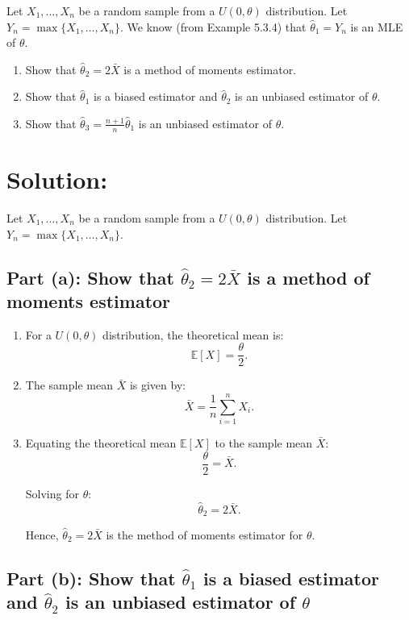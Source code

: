 \documentclass{article}
\begin{document}
Let $X_1, \dots, X_n$ be a random sample from a $U(0, \theta)$ distribution. Let $Y_n = \max\{X_1, \dots, X_n\}$. We know (from Example 5.3.4) that $\hat{\theta}_1 = Y_n$ is an MLE of $\theta$.

\begin{enumerate}
    \item[(a)] Show that $\hat{\theta}_2 = 2\bar{X}$ is a method of moments estimator.
    \item[(b)] Show that $\hat{\theta}_1$ is a biased estimator and $\hat{\theta}_2$ is an unbiased estimator of $\theta$.
    \item[(c)] Show that $\hat{\theta}_3 = \frac{n+1}{n} \hat{\theta}_1$ is an unbiased estimator of $\theta$.
\end{enumerate}

\section*{Solution:}

Let $X_1, \dots, X_n$ be a random sample from a $U(0, \theta)$ distribution. Let $Y_n = \max\{X_1, \dots, X_n\}$.

\subsection*{Part (a): Show that $\hat{\theta}_2 = 2\bar{X}$ is a method of moments estimator}

\begin{enumerate}
    \item For a $U(0, \theta)$ distribution, the theoretical mean is:
    \[
    \mathbb{E}[X] = \frac{\theta}{2}.
    \]

    \item The sample mean $\bar{X}$ is given by:
    \[
    \bar{X} = \frac{1}{n} \sum_{i=1}^n X_i.
    \]

    \item Equating the theoretical mean $\mathbb{E}[X]$ to the sample mean $\bar{X}$:
    \[
    \frac{\theta}{2} = \bar{X}.
    \]

    Solving for $\theta$:
    \[
    \hat{\theta}_2 = 2\bar{X}.
    \]

    Hence, $\hat{\theta}_2 = 2\bar{X}$ is the method of moments estimator for $\theta$.
\end{enumerate}

\subsection*{Part (b): Show that $\hat{\theta}_1$ is a biased estimator and $\hat{\theta}_2$ is an unbiased estimator of $\theta$}
\end{document}
